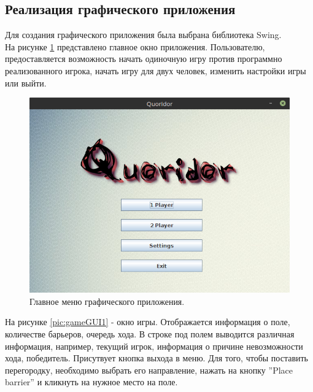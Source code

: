 \documentclass[a4paper]{article}
\begin{document}
\subsection{Реализация графического приложения}
Для создания графического приложения была выбрана библиотека Swing. \\

На рисунке \ref{pic:mainGUI} представлено главное окно приложения. Пользователю, предоставляется возможность начать одиночную игру против программно реализованного игрока, начать игру для двух человек, изменить настройки игры или выйти. 

\begin{figure}[H]
	\begin{center}
		\includegraphics[scale=0.5]{mainGUI}
		\caption{Главное меню графического приложения.} 
		\label{pic:mainGUI} %
	\end{center}
\end{figure}

На рисунке \ref{pic:gameGUI1} - окно игры. Отображается информация о поле, количестве барьеров, очередь хода. В строке под полем выводится различная информация, например, текущий игрок, информация о причине невозможности хода, победитель. Присутвует кнопка выхода в меню. Для того, чтобы поставить перегородку, необходимо выбрать его направление, нажать на кнопку ''Place barrier'' и кликнуть на нужное место на поле.
\end{document}
